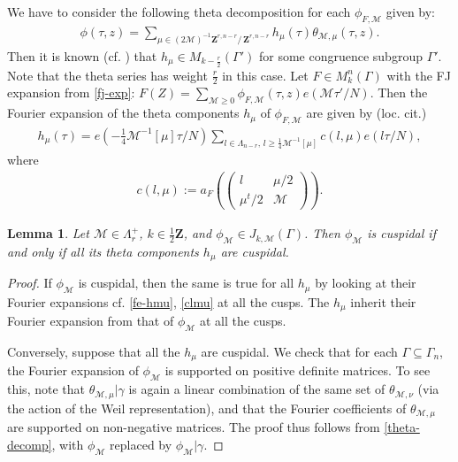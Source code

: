 \documentclass[12pt]{amsart}
\numberwithin{equation}{section}
\theoremstyle{plain}
\newtheorem{lem}[thm]{Lemma}
\theoremstyle{definition}
\newcommand{\mf}{\mathbf}
\newcommand{\mc}{\mathcal}
\newcommand{\mkngam}{M^n_k(\Gamma)}
\newcommand{\sumn}{\sum \nolimits}
\begin{document}
We have to consider the following theta decomposition for each $\phi_{F, \mc M}$ given by:
\begin{align} \label{theta-decomp}
    \phi(\tau,z) = \sumn_{\mu \in  (2 \mc M)^{-1}\mf Z^{r,n-r} \big/ \, \mf Z^{r,n-r} } h_\mu(\tau) \theta_{\mc M,\mu}(\tau,z). 
\end{align}
Then it is known (cf. \cite[Corollary~2 to Theorem~3.3]{ziegler}) that $h_\mu \in M_{k - \frac{r}{2}}(\Gamma')$ for some congruence subgroup $\Gamma'$. Note that the theta series has weight $\frac{r}{2}$ in this case. 
Let $F \in \mkngam$ with the FJ expansion from \eqref{fj-exp}: 
$\displaystyle F(Z) = \sumn_{\mc M \ge 0} \phi_{F,\mc M}(\tau,z) e(\mc M \tau'/N)$.
Then the Fourier expansion of the theta components $h_\mu$ of $\phi_{F,\mc M} $ are given by (loc. cit.)
\begin{align} \label{fe-hmu}
    h_\mu(\tau) = e(- \frac{1}{4} \mc M^{-1}[\mu] \tau/N) \sum_{ l \in  \Lambda_{n-r}, \, l \ge \frac{1}{4} \mc M^{-1}[\mu]  } c(l, \mu) e(l \tau/N),
\end{align}
where 
\begin{align} \label{clmu}
    c(l, \mu) := a_F (\begin{pmatrix} l & \mu/2 \\ \mu^t/2 & \mc  M \end{pmatrix}).
\end{align}

\begin{lem} \label{cusp-theta-comp}
    Let $\mc M \in \Lambda_r^+$, $k \in \tfrac{1}{2} \mf Z$, and $\phi_{\mc M} \in J_{k,\mc M}(\Gamma)$. Then $\phi_{\mc M}$ is cuspidal if and only if all its theta components $h_\mu$ are cuspidal.
\end{lem}

\begin{proof}
If $\phi_{\mc M}$ is cuspidal, then the same is true for all $h_\mu$ by looking at their Fourier expansions cf. \eqref{fe-hmu}, \eqref{clmu} at all the cusps. The $h_\mu$ inherit their Fourier expansion from that of $\phi_{\mc M}$ at all the cusps.

Conversely, suppose that all the $h_\mu$ are cuspidal. We check that for each $\Gamma \subseteq \Gamma_n$, the Fourier expansion of $\phi_{\mc M}$ is supported on positive definite matrices. To see this, note that $\theta_{\mc M,\mu}|\gamma $ is again a linear combination of the same set of $\theta_{\mc M,\nu}$ (via the action of the Weil representation), and that the Fourier coefficients of $\theta_{\mc M,\mu}$ are supported on non-negative matrices. The proof thus follows from \eqref{theta-decomp}, with $\phi_{\mc M}$ replaced by $\phi_{\mc M}|\gamma$.
\end{proof}
\end{document}
